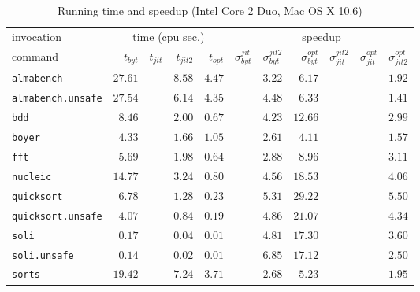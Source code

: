 \documentclass[12pt,a4paper,final]{article}
\begin{document}
\begin{table*}[p]
  \footnotesize
  \centering
  \begin{tabular}{l|rrrr|rrrrrr}
    \multicolumn{1}{l|}{\large invocation}
    & \multicolumn{4}{c|}{{\large time} (cpu sec.)}
    & \multicolumn{6}{c}{\large speedup}
    \\
    command
    & $t_{byt}$ & $t_{jit}$ & $t_{jit2}$ & $t_{opt}$
    & $\sigma^{jit}_{byt}$ & $\sigma^{jit2}_{byt}$ & $\sigma^{opt}_{byt}$
    & $\sigma^{jit2}_{jit}$ & $\sigma^{opt}_{jit}$ & $\sigma^{opt}_{jit2}$
    \\
    \hline
    \texttt{almabench} & $27.61$ & & $8.58$ & $4.47$ &  & $3.22$ & $6.17$ &  &  & $1.92$\\
    \texttt{almabench.unsafe} & $27.54$ &  & $6.14$ & $4.35$ &  & $4.48$ & $6.33$ &  &  & $1.41$\\
    \texttt{bdd} & $8.46$ &  & $2.00$ & $0.67$ &  & $4.23$ & $12.66$ &  &  & $2.99$\\
    \texttt{boyer} & $4.33$ &  & $1.66$ & $1.05$ &  & $2.61$ & $4.11$ &  &  & $1.57$\\
    \texttt{fft} & $5.69$ &  & $1.98$ & $0.64$ &  & $2.88$ & $8.96$ &  &  & $3.11$\\
    \texttt{nucleic} & $14.77$ &  & $3.24$ & $0.80$ &  & $4.56$ & $18.53$ &  &  & $4.06$\\
    \texttt{quicksort} & $6.78$ &  & $1.28$ & $0.23$ &  & $5.31$ & $29.22$ &  &  & $5.50$\\
    \texttt{quicksort.unsafe} & $4.07$ &  & $0.84$ & $0.19$ &  & $4.86$ & $21.07$ &  &  & $4.34$\\
    \texttt{soli} & $0.17$ &  & $0.04$ & $0.01$ &  & $4.81$ & $17.30$ &  &  & $3.60$\\
    \texttt{soli.unsafe} & $0.14$ &  & $0.02$ & $0.01$ &  & $6.85$ & $17.12$ &  &  & $2.50$\\
    \texttt{sorts} & $19.42$ &  & $7.24$ & $3.71$ &  & $2.68$ & $5.23$ &  &  & $1.95$\\
  \end{tabular}
  \caption{Running time and speedup (Intel Core 2 Duo, Mac OS X 10.6)}
  \label{table:Running_time_and_speedup_Intel_Core_2_Duo}
\end{table*}
\end{document}
